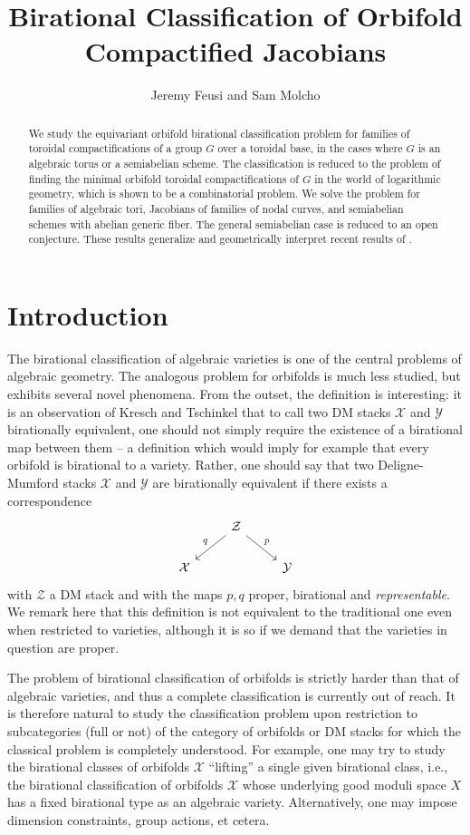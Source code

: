 \documentclass[11pt]{amsart}
\title{Birational Classification of Orbifold Compactified Jacobians}
\author{Jeremy Feusi and Sam Molcho}
\theoremstyle{definition}
\theoremstyle{remark}
\begin{document}
\begin{abstract}
	We study the equivariant orbifold birational classification problem for families of toroidal compactifications of a group $G$ over a toroidal base, in the cases where $G$ is an algebraic torus or a semiabelian scheme. The classification is reduced to the problem of finding the minimal orbifold toroidal compactifications of $G$ in the world of logarithmic geometry, which is shown to be a combinatorial problem. We solve the problem for families of algebraic tori, Jacobians of families of nodal curves, and semiabelian schemes with abelian generic fiber. The general semiabelian case is reduced to an open conjecture. These results generalize and geometrically interpret recent results of \cite{Schmitt}.
\end{abstract}

\maketitle

\tableofcontents

\section{Introduction}
The birational classification of algebraic varieties is one of the central
problems of algebraic geometry. The analogous problem for orbifolds is much
less studied, but exhibits several novel phenomena. From the outset, the definition
is interesting: it is an observation of Kresch and Tschinkel
\cite{KreschTschinkel} that to call two DM stacks $\mathcal{X}$ and
$\mathcal{Y}$ birationally equivalent, one should not simply require the
existence of a birational map between them -- a definition which would imply
for example that every orbifold is birational to a variety. Rather, one should
say that two Deligne-Mumford stacks $\mathcal{X}$ and $\mathcal{Y}$ are
birationally equivalent if there exists a correspondence
\[
\begin{tikzcd}
	& \mathcal{Z} \ar[rd,"p"] \ar[ld, swap, "q"] & \\ \mathcal{X}& &\mathcal{Y}
\end{tikzcd}
\]
with $\mathcal{Z}$ a DM stack and with the maps $p,q$ proper, birational and
\emph{representable}. We remark here that this definition is not equivalent to
the traditional one even when restricted to varieties, although it is
so if we demand that the varieties in question are proper.

The problem of birational classification of orbifolds is strictly
harder than that of algebraic varieties, and thus a complete classification is
currently out of reach. It is therefore natural to study the
classification problem upon restriction to subcategories (full or not) of the
category of orbifolds or DM stacks for which the classical problem is completely understood. For example, one may try to study the
birational classes of orbifolds $\mathcal{X}$ ``lifting'' a single given birational
class, i.e., the birational classification of orbifolds $\mathcal{X}$ whose
underlying good moduli space $X$ has a fixed birational type as an algebraic
variety. Alternatively, one may impose dimension constraints, group actions, et cetera.
\end{document}
